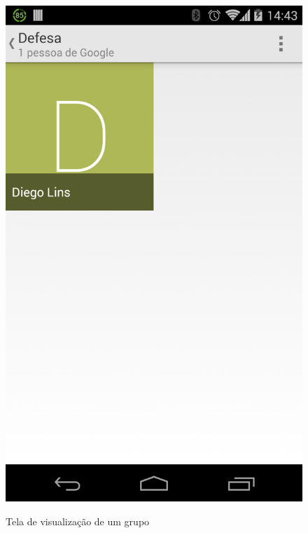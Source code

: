 \begin{figure}[!ht]
\begin{minipage}[b]{0.45\linewidth}
\begin{center}
		\end{center}
	\end{minipage}
\quad
	\begin{minipage}[b]{0.45\linewidth}
		\caption{Tela de visualização de um grupo}
		\begin{center}
			\includegraphics[scale=0.18]{img/contacts_group_view.png}
		\end{center}
		\label{fig:contacts_groups_view}
	\end{minipage}
\quad
	\begin{minipage}[b]{0.45\linewidth}

\end{minipage}
\end{figure}
